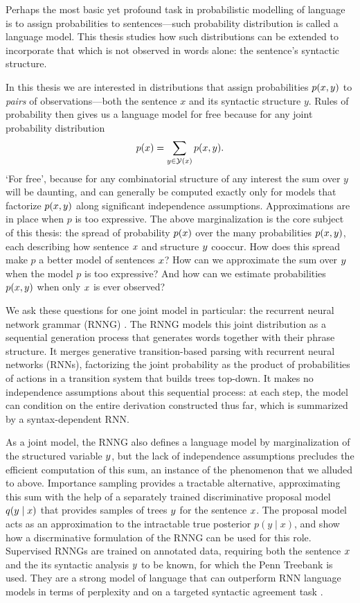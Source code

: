 Perhaps the most basic yet profound task in probabilistic modelling of language is to assign probabilities to sentences---such probability distribution is called a language model. This thesis studies how such distributions can be extended to incorporate that which is not observed in words alone: the sentence's syntactic structure.

In this thesis we are interested in distributions that assign probabilities $p(x, y)$ to \textit{pairs} of observations---both the sentence $x$ and its syntactic structure $y$. Rules of probability then gives us a language model for free because for any joint probability distribution
\begin{align*}
  p(x) = \sum_{y \in \mathcal{Y}(x)} p(x, y).
\end{align*}
`For free', because for any combinatorial structure of any interest the sum over $y$ will be daunting, and can generally be computed exactly only for models that factorize $p(x, y)$ along significant independence assumptions. Approximations are  in place when $p$ is too expressive. The above marginalization is the core subject of this thesis: the spread of probability $p(x)$ over the many probabilities $p(x, y)$, each describing how sentence $x$ and structure $y$ cooccur. How does this spread make $p$ a better model of sentences $x$? How can we approximate the sum over $y$ when the model $p$ is too expressive? And how can we estimate probabilities $p(x, y)$ when only $x$ is ever observed?

We ask these questions for one joint model in particular: the recurrent neural network grammar (RNNG) \citep{dyer2016rnng}. The RNNG models this joint distribution as a sequential generation process that generates words together with their phrase structure. It merges generative transition-based parsing with recurrent neural networks (RNNs), factorizing the joint probability as the product of probabilities of actions in a transition system that builds trees top-down. It makes no independence assumptions about this sequential process: at each step, the model can condition on the entire derivation constructed thus far, which is summarized by a syntax-dependent RNN.

As a joint model, the RNNG also defines a language model by marginalization of the structured variable $y$, but the lack of independence assumptions precludes the efficient computation of this sum, an instance of the phenomenon that we alluded to above. Importance sampling provides a tractable alternative, approximating this sum with the help of a separately trained discriminative proposal model $q(y \mid x)$ that provides samples of trees $y$ for the sentence $x$. The proposal model acts as an approximation to the intractable true posterior $p(y \mid x)$, and \citet{dyer2016rnng} show how a discrminative formulation of the RNNG can be used for this role. Supervised RNNGs are trained on annotated data, requiring both the sentence $x$ and the its syntactic analysis $y$ to be known, for which the Penn Treebank \citep{marcus1993penn} is used. They are a strong model of language that can outperform RNN language models in terms of perplexity \citep{dyer2016rnng} and on a targeted syntactic agreement task \citep{kuncoro2018learn}.

